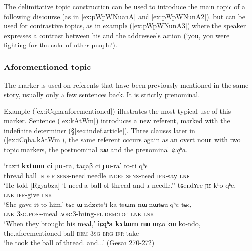 The delimitative topic  construction can be used to introduce the main topic of a following discourse (as in \ref{ex:pWpWNuanA} and \ref{ex:pWpWNunA2}), but can be used for contrastive topics, as in example (\ref{ex:pWpWNunA3}) where the speaker expresses a contrast between his and the addressee's action (`you, you were fighting for the sake of other people').

 
 \subsubsection{Aforementioned topic} \label{sec:iCqha}
 The marker   is used on referents that have been previously mentioned in the same story, usually only a few sentences back. It is strictly prenominal. 
 
Example (\ref{ex:iCqha.aforementioned}) illustrates the most typical use of this marker. Sentence (\ref{ex:kAtWm}) introduces a new referent,  marked with the indefinite determiner  (§\ref{sec:indef.article}). Three clauses later in (\ref{ex:iCqha.kAtWm}), the same referent occurs again as an overt noun with two topic markers, the postnominal \textit{nɯ} and the prenominal \textit{iɕqʰa}.
 
  
\begin{exe}
\ex \label{ex:iCqha.aforementioned}
\begin{xlist}
\ex \label{ex:kAtWm}
\gll `razri \textbf{kɤtɯm} \textbf{ci} ɲɯ-ra, taqaβ ci ɲɯ-ra' to-ti qʰe   \\
 thread ball \textsc{indef} \textsc{sens}-need needle \textsc{indef} \textsc{sens}-need \textsc{ifr}-say \textsc{lnk}  \\
\glt `He told [Rgyabza] `I need a ball of thread and a needle.''  
\ex  
\gll tɕendɤre ɲɤ-kʰo qʰe,  \\
\textsc{lnk} \textsc{ifr}-give \textsc{lnk}   \\
\glt `She gave it to him.'
\ex 
\gll  tɕe ɯ-ndzɤtsʰi ka-tsɯm-nɯ nɯtɕu qʰe tɕe,   \\
 \textsc{lnk} \textsc{3sg}.\textsc{poss}-meal \textsc{aor}:3\flobv{}-bring-\textsc{pl} \textsc{dem}:\textsc{loc}  \textsc{lnk} \textsc{lnk}    \\
\glt `When they brought his meal,'
\ex \label{ex:iCqha.kAtWm}
\gll   \textbf{iɕqʰa} \textbf{kɤtɯm} \textbf{nɯ} ɯʑo kɯ ko-ndo, \\
   the.aforementioned ball \textsc{dem} \textsc{3sg} \textsc{erg} \textsc{ifr}-take \\
\glt `he took the ball of thread, and...' (Gesar 270-272)
\end{xlist}
\end{exe}
 
